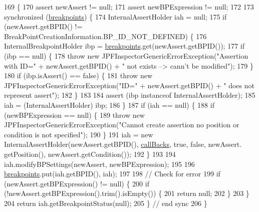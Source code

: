 \begin{DoxyCode}
169                                                                                                            
                                                 \{
170     assert newAssert != null;
171     assert newBPExpression != null;
172 
173     \textcolor{keyword}{synchronized} (\hyperlink{classgov_1_1nasa_1_1jpf_1_1inspector_1_1server_1_1breakpoints_1_1_break_point_handler_a034265be2e9419b28fa12d1b860295df}{breakpoints}) \{
174       InternalAssertHolder iah = null;
175       \textcolor{keywordflow}{if} (newAssert.getBPID() != BreakPointCreationInformation.BP\_ID\_NOT\_DEFINED) \{
176         InternalBreakpointHolder ibp = \hyperlink{classgov_1_1nasa_1_1jpf_1_1inspector_1_1server_1_1breakpoints_1_1_break_point_handler_a034265be2e9419b28fa12d1b860295df}{breakpoints}.get(newAssert.getBPID());
177         \textcolor{keywordflow}{if} (ibp == null) \{
178           \textcolor{keywordflow}{throw} \textcolor{keyword}{new} JPFInspectorGenericErrorException(\textcolor{stringliteral}{"Assertion with ID="} + newAssert.getBPID() + \textcolor{stringliteral}{" not
       exists --> cann't be modified"});
179         \}
180         \textcolor{keywordflow}{if} (ibp.isAssert() == \textcolor{keyword}{false}) \{
181           \textcolor{keywordflow}{throw} \textcolor{keyword}{new} JPFInspectorGenericErrorException(\textcolor{stringliteral}{"ID="} + newAssert.getBPID() + \textcolor{stringliteral}{" does not represent
       assert"});
182         \}
183 
184         assert (ibp instanceof InternalAssertHolder);
185         iah = (InternalAssertHolder) ibp;
186       \}
187       \textcolor{keywordflow}{if} (iah == null) \{
188         \textcolor{keywordflow}{if} (newBPExpression == null) \{
189           \textcolor{keywordflow}{throw} \textcolor{keyword}{new} JPFInspectorGenericErrorException(\textcolor{stringliteral}{"Cannot create assertion no position or condition is
       not specified"});
190         \}
191         iah = \textcolor{keyword}{new} InternalAssertHolder(newAssert.getBPID(), \hyperlink{classgov_1_1nasa_1_1jpf_1_1inspector_1_1server_1_1breakpoints_1_1_break_point_handler_a1ee790b3c2c618b92a860b38e9171bfc}{callBacks}, \textcolor{keyword}{true}, \textcolor{keyword}{false}, newAssert.
      getPosition(), newAssert.getCondition());
192       \}
193 
194       iah.modifyBPSettings(newAssert, newBPExpression);
195 
196       \hyperlink{classgov_1_1nasa_1_1jpf_1_1inspector_1_1server_1_1breakpoints_1_1_break_point_handler_a034265be2e9419b28fa12d1b860295df}{breakpoints}.put(iah.getBPID(), iah);
197 
198       \textcolor{comment}{// Check for error}
199       \textcolor{keywordflow}{if} (newAssert.getBPExpression() != null) \{
200         \textcolor{keywordflow}{if} (!newAssert.getBPExpression().trim().isEmpty()) \{
201           \textcolor{keywordflow}{return} null;
202         \}
203       \}
204       \textcolor{keywordflow}{return} iah.getBreakpointStatus(null);
205     \} \textcolor{comment}{// end sync}
206   \}
\end{DoxyCode}
